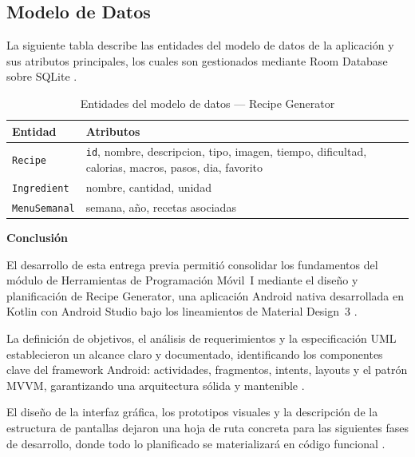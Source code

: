 \documentclass[stu, 12pt, letterpaper, donotrepeattitle, floatsintext, natbib]{apa7}
\begin{document}
\subsection{Modelo de Datos}

La siguiente tabla describe las entidades del modelo de datos de la aplicación y sus
atributos principales, los cuales son gestionados mediante Room Database sobre SQLite
\citep{androiddevelopers2024room}.

\begin{table}[H]
\caption{Entidades del modelo de datos --- Recipe Generator}
\label{tab:modelodatos}
\begin{tabularx}{\textwidth}{@{}lX@{}}
\toprule
\textbf{Entidad} & \textbf{Atributos} \\
\midrule
\texttt{Recipe}      & \texttt{id}, nombre, descripcion, tipo, imagen, tiempo, dificultad,
                       calorias, macros, pasos, dia, favorito \\[4pt]
\texttt{Ingredient}  & nombre, cantidad, unidad \\[4pt]
\texttt{MenuSemanal} & semana, año, recetas asociadas \\
\bottomrule
\end{tabularx}
\end{table}

\begin{center}
\textbf{\Large Conclusión}
\end{center}
{\normalsize\setlength{\parskip}{6pt}

El desarrollo de esta entrega previa permitió consolidar los fundamentos del módulo
de Herramientas de Programación Móvil~I mediante el diseño y planificación de
Recipe Generator, una aplicación Android nativa desarrollada en Kotlin con Android
Studio bajo los lineamientos de Material Design~3 \citep{googlematerial2024}.

La definición de objetivos, el análisis de requerimientos y la especificación UML
establecieron un alcance claro y documentado, identificando los componentes clave del
framework Android: actividades, fragmentos, intents, layouts y el patrón MVVM,
garantizando una arquitectura sólida y mantenible \citep{smyth2017}.

El diseño de la interfaz gráfica, los prototipos visuales y la descripción de la
estructura de pantallas dejaron una hoja de ruta concreta para las siguientes fases
de desarrollo, donde todo lo planificado se materializará en código funcional
\citep{robledo2017}.
}

\renewcommand{\refname}{\large\textbf{Referencias}}

\end{document}
